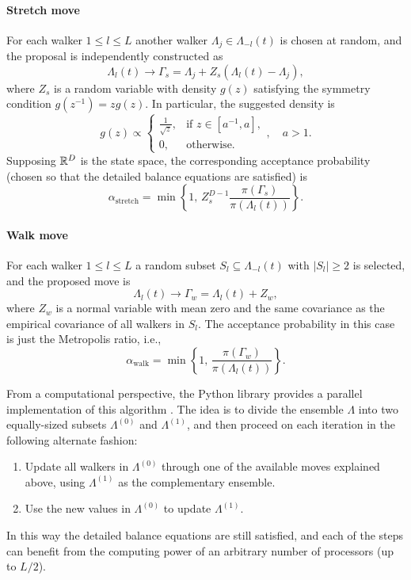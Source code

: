 \paragraph{Stretch move} For each walker \(1\leq l \leq L\) another walker \(\Lambda_j \in \Lambda_{-l}(t)\) is chosen at random, and the proposal is independently constructed as
\[
  \Lambda_l(t) \to \Gamma_s = \Lambda_j + Z_s(\Lambda_l(t) - \Lambda_j),
\]
where \(Z_s\) is a random variable with density \(g(z)\) satisfying the symmetry condition \(g(z^{-1})=zg(z)\). In particular, the suggested density is
\begin{equation}\label{eq:stretch-move-density}
  g(z) \propto \begin{cases}
    \frac{1}{\sqrt{z}}, & \text{if } z \in [a^{-1}, a], \\
    0,                  & \text{otherwise.}
  \end{cases}, \quad a > 1.
\end{equation}
Supposing \(\mathbb{R}^D\) is the state space, the corresponding acceptance probability (chosen so that the detailed balance equations are satisfied) is
\[
  \alpha_{\text{stretch}} = \min\left\{1, \, Z_s^{D-1}\frac{\pi(\Gamma_s)}{\pi(\Lambda_l(t))}\right\}.
\]

\paragraph{Walk move} For each walker \(1\leq l \leq L\) a random subset \(S_l \subseteq \Lambda_{-l}(t)\) with \(|S_l| \geq 2\) is selected, and the proposed move is
\[
  \Lambda_l(t) \to \Gamma_w = \Lambda_l(t) + Z_w,
\]
where \(Z_w\) is a normal variable with mean zero and the same covariance as the empirical covariance of all walkers in \(S_l\). The acceptance probability in this case is just the Metropolis ratio, i.e., 
\[
  \alpha_{\text{walk}} = \min\left\{1,\, \frac{\pi(\Gamma_w)}{\pi(\Lambda_l(t))}\right\}.
\]

From a computational perspective, the Python library   provides a parallel implementation of this algorithm \citep{foreman2013emcee}. The idea is to divide the ensemble \(\Lambda\) into two equally-sized subsets \(\Lambda^{(0)}\) and \(\Lambda^{(1)}\), and then proceed on each iteration in the following alternate fashion:
\begin{enumerate}
  \item Update all walkers in \(\Lambda^{(0)}\) through one of the available moves explained above, using \(\Lambda^{(1)}\) as the complementary ensemble.
  \item Use the new values in \(\Lambda^{(0)}\) to update \(\Lambda^{(1)}\).
\end{enumerate}
In this way the detailed balance equations are still satisfied, and each of the steps can benefit from the computing power of an arbitrary number of processors (up to \(L/2\)).  

